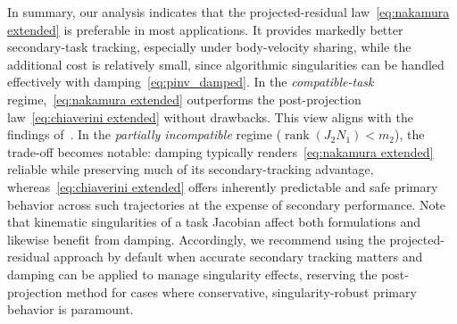\documentclass[../main.tex]{subfiles}
\begin{document}

In summary, our analysis indicates that the projected-residual law~\eqref{eq:nakamura extended} is preferable in most applications. It provides markedly better secondary-task tracking, especially under body-velocity sharing, while the additional cost is relatively small, since algorithmic singularities can be handled effectively with damping~\eqref{eq:pinv_damped}. In the \emph{compatible-task} regime,~\eqref{eq:nakamura extended} outperforms the post-projection law~\eqref{eq:chiaverini extended} without drawbacks. This view aligns with the findings of~\cite{baerlocher1998}. In the \emph{partially incompatible} regime ($\operatorname{rank}(J_2N_1)<m_2$), the trade-off becomes notable: damping typically renders~\eqref{eq:nakamura extended} reliable while preserving much of its secondary-tracking advantage, whereas~\eqref{eq:chiaverini extended} offers inherently predictable and safe primary behavior across such trajectories at the expense of secondary performance. Note that kinematic singularities of a task Jacobian affect both formulations and likewise benefit from damping. Accordingly, we recommend using the projected-residual approach by default when accurate secondary tracking matters and damping can be applied to manage singularity effects, reserving the post-projection method for cases where conservative, singularity-robust primary behavior is paramount.
\end{document}
